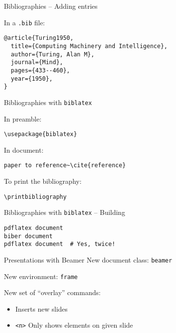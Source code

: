 \documentclass[t]{beamer}
\begin{document}
\begin{frame}[fragile]{Bibliographies -- Adding entries}

  In a \texttt{.bib} file:

  \begin{verbatim}
@article{Turing1950,
  title={Computing Machinery and Intelligence},
  author={Turing, Alan M},
  journal={Mind},
  pages={433--460},
  year={1950},
}
  \end{verbatim}

\end{frame}

\begin{frame}[fragile]{Bibliographies with \texttt{biblatex}}

  In preamble:

  \begin{verbatim}
\usepackage{biblatex}

  \end{verbatim}
  \vfill

  In document:

  \begin{verbatim}
paper to reference~\cite{reference}
  \end{verbatim}
  \vfill

  To print the bibliography:

  \begin{verbatim}
\printbibliography
  \end{verbatim}
\end{frame}

\begin{frame}[fragile]{Bibliographies with \texttt{biblatex} -- Building}
  \begin{verbatim}
pdflatex document
biber document
pdflatex document  # Yes, twice!
  \end{verbatim}
\end{frame}

\begin{frame}{Presentations with Beamer}
  New document class: \texttt{beamer}
  \pause

  New environment: \texttt{frame}
  \pause

  New set of ``overlay'' commands:
  \begin{itemize}[<+->]
    \item \texttt{\pause} Inserts new slides
    \item \texttt{\only<n>} Only shows elements on given slide
  \end{itemize}
\end{frame}
\end{document}
